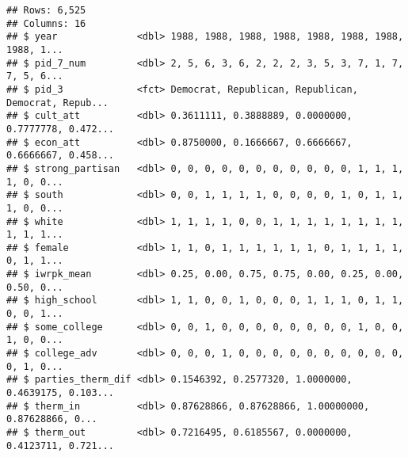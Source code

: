 \documentclass[
]{article}
\newenvironment{Shaded}{\begin{snugshade}}{\end{snugshade}}
\newcommand{\CommentTok}[1]{\textcolor[rgb]{0.56,0.35,0.01}{\textit{#1}}}
\newcommand{\DataTypeTok}[1]{\textcolor[rgb]{0.13,0.29,0.53}{#1}}
\newcommand{\DecValTok}[1]{\textcolor[rgb]{0.00,0.00,0.81}{#1}}
\newcommand{\KeywordTok}[1]{\textcolor[rgb]{0.13,0.29,0.53}{\textbf{#1}}}
\newcommand{\NormalTok}[1]{#1}
\newcommand{\OperatorTok}[1]{\textcolor[rgb]{0.81,0.36,0.00}{\textbf{#1}}}
\newcommand{\StringTok}[1]{\textcolor[rgb]{0.31,0.60,0.02}{#1}}
\begin{document}
\begin{verbatim}
## Rows: 6,525
## Columns: 16
## $ year              <dbl> 1988, 1988, 1988, 1988, 1988, 1988, 1988, 1988, 1...
## $ pid_7_num         <dbl> 2, 5, 6, 3, 6, 2, 2, 2, 3, 5, 3, 7, 1, 7, 7, 5, 6...
## $ pid_3             <fct> Democrat, Republican, Republican, Democrat, Repub...
## $ cult_att          <dbl> 0.3611111, 0.3888889, 0.0000000, 0.7777778, 0.472...
## $ econ_att          <dbl> 0.8750000, 0.1666667, 0.6666667, 0.6666667, 0.458...
## $ strong_partisan   <dbl> 0, 0, 0, 0, 0, 0, 0, 0, 0, 0, 0, 1, 1, 1, 1, 0, 0...
## $ south             <dbl> 0, 0, 1, 1, 1, 1, 0, 0, 0, 0, 1, 0, 1, 1, 1, 0, 0...
## $ white             <dbl> 1, 1, 1, 1, 0, 0, 1, 1, 1, 1, 1, 1, 1, 1, 1, 1, 1...
## $ female            <dbl> 1, 1, 0, 1, 1, 1, 1, 1, 1, 0, 1, 1, 1, 1, 0, 1, 1...
## $ iwrpk_mean        <dbl> 0.25, 0.00, 0.75, 0.75, 0.00, 0.25, 0.00, 0.50, 0...
## $ high_school       <dbl> 1, 1, 0, 0, 1, 0, 0, 0, 1, 1, 1, 0, 1, 1, 0, 0, 1...
## $ some_college      <dbl> 0, 0, 1, 0, 0, 0, 0, 0, 0, 0, 0, 1, 0, 0, 1, 0, 0...
## $ college_adv       <dbl> 0, 0, 0, 1, 0, 0, 0, 0, 0, 0, 0, 0, 0, 0, 0, 1, 0...
## $ parties_therm_dif <dbl> 0.1546392, 0.2577320, 1.0000000, 0.4639175, 0.103...
## $ therm_in          <dbl> 0.87628866, 0.87628866, 1.00000000, 0.87628866, 0...
## $ therm_out         <dbl> 0.7216495, 0.6185567, 0.0000000, 0.4123711, 0.721...
\end{verbatim}

\begin{Shaded}
\end{Shaded}
\end{document}
